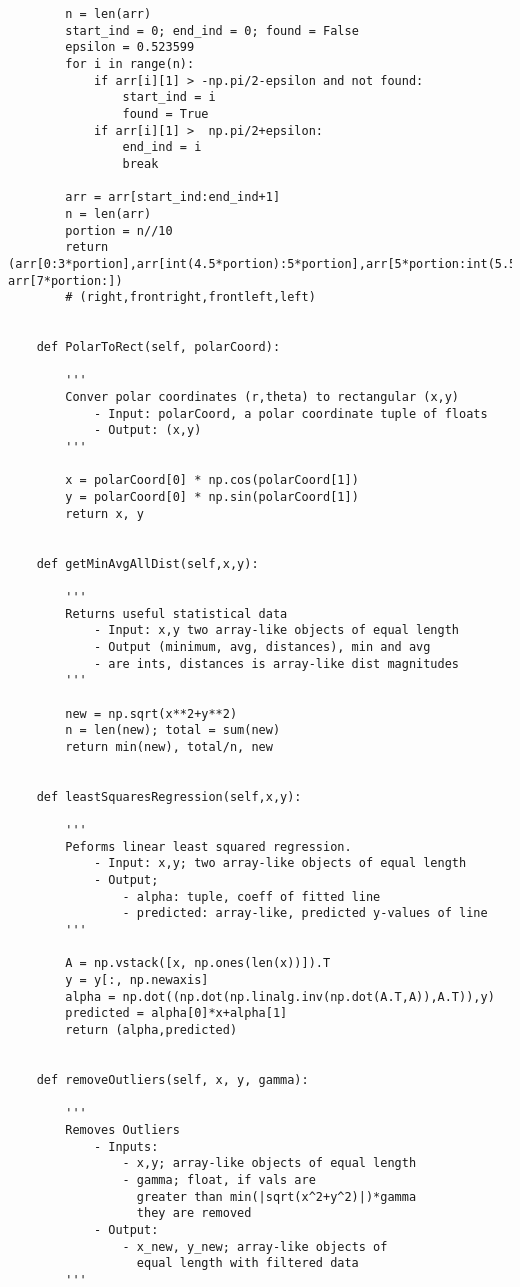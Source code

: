 \documentclass{article}
\begin{document}
{\begin{verbatim}
        n = len(arr)
        start_ind = 0; end_ind = 0; found = False
        epsilon = 0.523599
        for i in range(n):
            if arr[i][1] > -np.pi/2-epsilon and not found:
                start_ind = i
                found = True
            if arr[i][1] >  np.pi/2+epsilon:
                end_ind = i
                break
        
        arr = arr[start_ind:end_ind+1]
        n = len(arr)
        portion = n//10
        return (arr[0:3*portion],arr[int(4.5*portion):5*portion],arr[5*portion:int(5.5*portion)], arr[7*portion:]) 
        # (right,frontright,frontleft,left)
    

    def PolarToRect(self, polarCoord):

        '''
        Conver polar coordinates (r,theta) to rectangular (x,y)
            - Input: polarCoord, a polar coordinate tuple of floats
            - Output: (x,y)
        '''

        x = polarCoord[0] * np.cos(polarCoord[1])
        y = polarCoord[0] * np.sin(polarCoord[1])
        return x, y
    

    def getMinAvgAllDist(self,x,y):

        '''
        Returns useful statistical data
            - Input: x,y two array-like objects of equal length
            - Output (minimum, avg, distances), min and avg
            - are ints, distances is array-like dist magnitudes
        '''

        new = np.sqrt(x**2+y**2)
        n = len(new); total = sum(new)
        return min(new), total/n, new
    

    def leastSquaresRegression(self,x,y):

        '''
        Peforms linear least squared regression.
            - Input: x,y; two array-like objects of equal length
            - Output; 
                - alpha: tuple, coeff of fitted line
                - predicted: array-like, predicted y-values of line
        '''

        A = np.vstack([x, np.ones(len(x))]).T
        y = y[:, np.newaxis]
        alpha = np.dot((np.dot(np.linalg.inv(np.dot(A.T,A)),A.T)),y)
        predicted = alpha[0]*x+alpha[1]
        return (alpha,predicted)
    
    
    def removeOutliers(self, x, y, gamma):

        '''
        Removes Outliers
            - Inputs:
                - x,y; array-like objects of equal length
                - gamma; float, if vals are
                  greater than min(|sqrt(x^2+y^2)|)*gamma 
                  they are removed
            - Output:
                - x_new, y_new; array-like objects of 
                  equal length with filtered data
        '''


\end{verbatim}}
\end{document}
